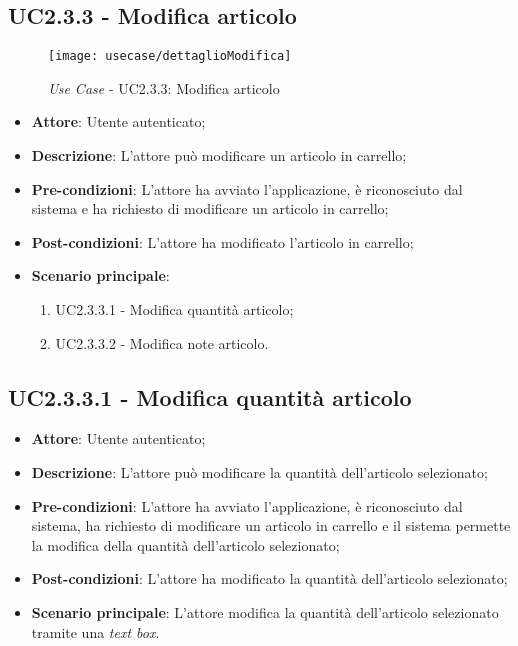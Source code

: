 \newpage

\subsection{UC2.3.3 - Modifica articolo}

\begin{figure}[!h] 
    \centering 
    \texttt{[image: usecase/dettaglioModifica]} 
    \caption{\textit{Use Case} - UC2.3.3: Modifica articolo}
\end{figure}

\begin{itemize}
	\item \textbf{Attore}: Utente autenticato;
	\item \textbf{Descrizione}: L'attore può modificare un articolo in carrello;
	\item \textbf{Pre-condizioni}: L'attore ha avviato l'applicazione, è riconosciuto dal sistema e ha richiesto di modificare un articolo in carrello;
	\item \textbf{Post-condizioni}: L'attore ha modificato l'articolo in carrello;
	\item \textbf{Scenario principale}:
		\begin{enumerate}
			\item UC2.3.3.1 - Modifica quantità articolo;
			\item UC2.3.3.2 - Modifica note articolo.
		\end{enumerate}
\end{itemize}

\subsection{UC2.3.3.1 - Modifica quantità articolo}

\begin{itemize}
	\item \textbf{Attore}: Utente autenticato;
	\item \textbf{Descrizione}: L'attore può modificare la quantità dell'articolo selezionato;
	\item \textbf{Pre-condizioni}: L'attore ha avviato l'applicazione, è riconosciuto dal sistema, ha richiesto di modificare un articolo in carrello e il sistema permette la modifica della quantità dell'articolo selezionato;
	\item \textbf{Post-condizioni}: L'attore ha modificato la quantità dell'articolo selezionato;
	\item \textbf{Scenario principale}: L'attore modifica la quantità dell'articolo selezionato tramite una \textit{text box}.
\end{itemize}

